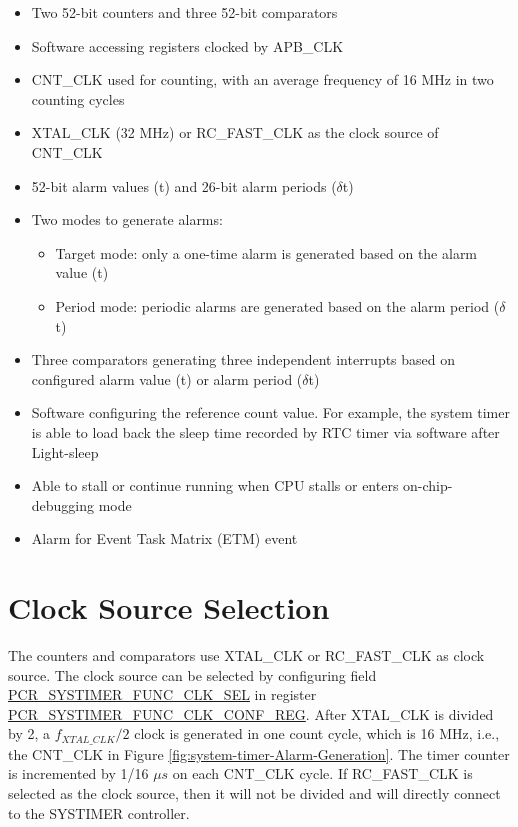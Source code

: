 \documentclass[main\_\_EN.tex]{subfiles}
\begin{document}
\begin{itemize}
    \item Two 52-bit counters and three 52-bit comparators
    \item Software accessing registers clocked by APB\_CLK
    \item CNT\_CLK used for counting, with an average frequency of 16 MHz in two counting cycles
    \item XTAL\_CLK (32 MHz) or RC\_FAST\_CLK as the clock source of CNT\_CLK
    \item 52-bit alarm values (t) and 26-bit alarm periods ($\delta$t)
    \item Two modes to generate alarms:
    \begin{itemize}
        \item Target mode: only a one-time alarm is generated based on the alarm value (t)
        \item Period mode: periodic alarms are generated based on the alarm period ($\delta$t)
    \end{itemize}
    \item Three comparators generating three independent interrupts based on configured alarm value (t) or alarm period ($\delta$t)
    \item Software configuring the reference count value. For example, the system timer is able to load back the sleep time recorded by RTC timer via software after Light-sleep
    \item Able to stall or continue running when CPU stalls or enters on-chip-debugging mode
    \item Alarm for Event Task Matrix (ETM) event
\end{itemize}


\section{Clock Source Selection}
The counters and comparators use XTAL\_CLK or RC\_FAST\_CLK as clock source. The clock source can be selected by configuring field \hyperref[fielddesc:PCRSYSTIMERFUNCCLKSEL]{PCR\_SYSTIMER\_FUNC\_CLK\_SEL} in register \hyperref[regdesc:PCRSYSTIMERFUNCCLKCONFREG]{PCR\_SYSTIMER\_FUNC\_CLK\_CONF\_REG}. After XTAL\_CLK is divided by 2, a $f_{XTAL\_CLK}/2$ clock is generated in one count cycle, which is 16 MHz, i.e., the CNT\_CLK in Figure \ref{fig:system-timer-Alarm-Generation}. The timer counter is incremented by 1/16 $\mu s$ on each CNT\_CLK cycle. If RC\_FAST\_CLK is selected as the clock source, then it will not be divided and will directly connect to the SYSTIMER controller.
\end{document}
